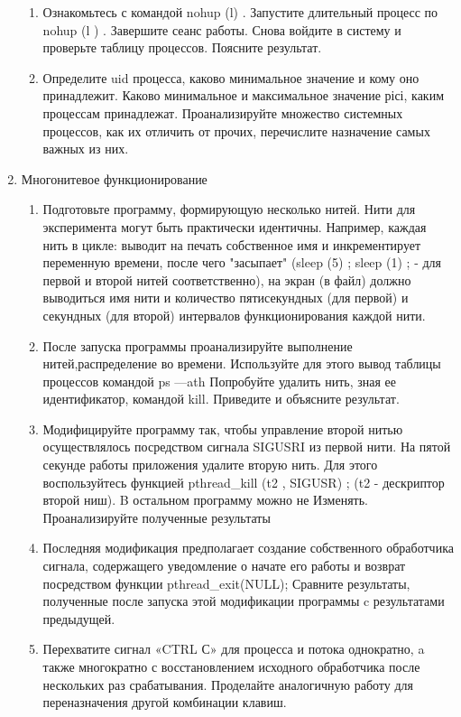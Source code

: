 \documentclass[a4paper]{article}
\begin{document}
\begin{enumerate}
\begin{enumerate}
		\item Ознакомьтесь с командой nohup (l) . Запустите длительный процесс по nohup (l ) . Завершите сеанс работы. Снова войдите в систему и проверьте таблицу процессов. Поясните результат.

		\item Определите uid процесса, каково минимальное значение и кому оно принадлежит. Каково минимальное и максимальное значение рісі, каким процессам принадлежат. Проанализируйте множество системных процессов, как их отличить от прочих, перечислите назначение самых важных из них.
	\end{enumerate}
	\item Многонитевое функционирование
		\begin{enumerate}
		\item Подготовьте программу, формирующую несколько нитей. Нити для эксперимента могут быть практически идентичны. Например, каждая нить в цикле: выводит на печать собственное имя и инкрементирует переменную времени, после чего "засыпает" (sleep (5) ; sleep (1) ; - для первой и второй нитей соответственно), на экран (в файл) должно выводиться имя нити и количество пятисекундных (для первой) и секундных (для второй) интервалов функционирования каждой нити.
		
		\item После запуска программы проанализируйте выполнение нитей,распределение во времени. Используйте для этого вывод таблицы процессов командой ps —ath Попробуйте удалить нить, зная ее идентификатор, командой kill. Приведите и объясните результат.

		\item Модифицируйте программу так, чтобы управление второй нитью осуществлялось посредством сигнала SIGUSRI из первой нити. На пятой секунде работы приложения удалите вторую нить. Для этого воспользуйтесь функцией pthread\_kill (t2 , SIGUSR) ; (t2 - дескриптор второй ниш). B остальном программу можно не Изменять. Проанализируйте полученные результаты

		\item Последняя модификация предполагает создание собственного обработчика сигнала, содержащего уведомление о начате его работы и возврат посредством функции pthread\_exit(NULL); Сравните результаты, полученные после запуска этой модификации программы c результатами предыдущей.

		\item Перехватите сигнал «CTRL С» для процесса и потока однократно, a
также многократно с восстановлением исходного обработчика после
нескольких раз срабатывания. Проделайте аналогичную работу для
переназначения другой комбинации клавиш.


\end{enumerate}
\end{enumerate}
\end{document}
